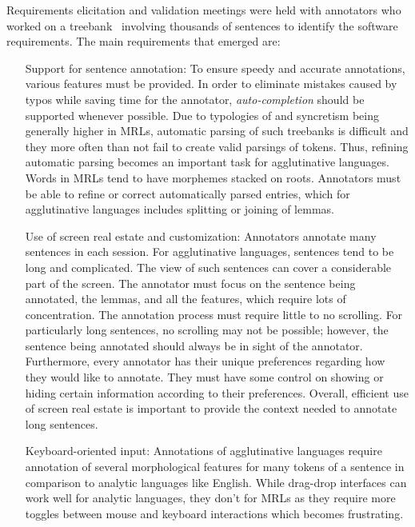 \documentclass{elektr}
\begin{document}
Requirements elicitation and validation meetings were held with annotators who worked on a treebank~\cite{anon} involving thousands of sentences to identify the software requirements.
The main requirements that emerged are:
\begin{itemize}[before=\normalfont, font=\itshape, align=left,noitemsep,topsep=0pt,parsep=3pt,partopsep=0pt,labelsep=3pt,align=left]
    \item[Support for sentence annotation:]
        To ensure speedy and accurate annotations, various features must be provided.
        In order to eliminate mistakes caused by typos while saving time for the annotator, \textit{auto-completion} should be supported whenever possible.
        Due to typologies of and syncretism being generally higher in MRLs, automatic parsing of such treebanks is difficult and they more often than not fail to create valid parsings of tokens.
        Thus, refining automatic parsing becomes an important task for agglutinative languages.
        Words in MRLs tend to have morphemes stacked on roots.
        Annotators must be able to refine or correct automatically parsed entries, which for agglutinative languages includes splitting or joining of lemmas.
    \item[Use of screen real estate and customization:]
        Annotators annotate many sentences in each session.
        For agglutinative languages, sentences tend to be long and complicated.
        The view of such sentences can cover a considerable part of the screen.
        The annotator must focus on the sentence being annotated, the lemmas, and all the features, which require lots of concentration.
        The annotation process must require little to no scrolling.
        For particularly long sentences, no scrolling may not be possible; however, the sentence being annotated should always be in sight of the annotator.
        Furthermore, every annotator has their unique preferences regarding how they would like to annotate.
        They must have some control on showing or hiding certain information according to their preferences.
        Overall, efficient use of screen real estate is important to provide the context needed to annotate long sentences.
    \item[Keyboard-oriented input:]
        Annotations of agglutinative languages require annotation of several morphological features for many tokens of a sentence in comparison to analytic languages like English.
        While drag-drop interfaces can work well for analytic languages, they don't for MRLs as they require more toggles between mouse and keyboard interactions which becomes frustrating.

\end{itemize}
\end{document}
